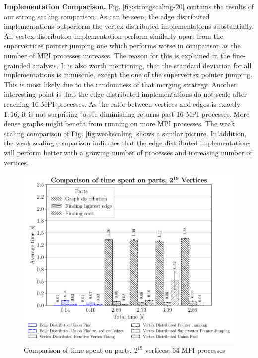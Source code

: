 \documentclass[letterpaper]{article}
\newcommand{\mypar}[1]{{\bf #1.}}
\begin{document}
\mypar{Implementation Comparison}
Fig. \ref{fig:strongscaling-20} contains the results of our strong scaling comparison. As can be seen, the edge
distributed implementations outperform the vertex distributed implementations substantially. All vertex distribution
implementation perform similarly apart from the supervertices pointer jumping one which performs worse in comparison as
the number of MPI processes increases. The reason for this is explained in the fine-grainded analysis. It is also worth
mentioning, that the standard deviation for all implementations is minuscule, except the one of the supervertex pointer
jumping. This is most likely due to the randomness of that merging strategy. Another interesting point is that the edge
distributed implementations do not scale after reaching $16$ MPI processes. As the ratio between vertices and edges is
exactly $1:16$, it is not surprising to see diminishing returns past 16 MPI processes. More dense graphs might benefit
from running on more MPI processes.
The weak scaling comparison of Fig. \ref{fig:weakscaling} shows a similar picture. In addition, the weak scaling
comparison indicates that the edge distributed implementations will perform better with a growing number of processes
and increasing number of vertices.

\begin{figure}
  \includegraphics[width=\columnwidth]{../benchmark-results/plots/comparison.pdf}
  \caption{Comparison of time spent on parts, $2^{19}$ vertices, 64 MPI processes}
  \label{fig:comparison}
\end{figure}
\end{document}
